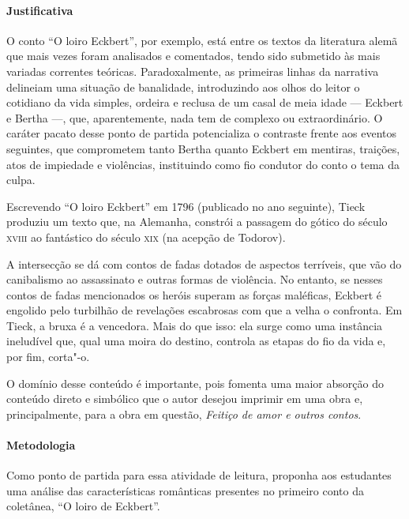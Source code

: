\documentclass[12pt]{extarticle}
\begin{document}
\paragraph{Justificativa} O conto ``O loiro Eckbert'', por exemplo, está entre os textos da
literatura alemã que mais vezes foram analisados e comentados, tendo
sido submetido às mais variadas correntes teóricas. Paradoxalmente, as
primeiras linhas da narrativa delineiam uma situação de banalidade,
introduzindo aos olhos do leitor o cotidiano da vida simples, ordeira e
reclusa de um casal de meia idade --- Eckbert e Bertha ---, que,
aparentemente, nada tem de complexo ou extraordinário. O caráter pacato
desse ponto de partida potencializa o contraste frente aos eventos
seguintes, que comprometem tanto Bertha quanto Eckbert em mentiras,
traições, atos de impiedade e violências, instituindo como fio condutor
do conto o tema da culpa.

Escrevendo ``O loiro Eckbert'' em 1796 (publicado no ano seguinte),
Tieck produziu um texto que, na Alemanha, constrói a passagem do gótico
do século \textsc{xviii} ao fantástico do século \textsc{xix} (na acepção de Todorov).

A intersecção se dá com contos de fadas dotados de aspectos terríveis,
que vão do canibalismo ao assassinato e outras formas de violência. No
entanto, se nesses contos de fadas mencionados os heróis superam as
forças maléficas, Eckbert é engolido pelo turbilhão de revelações
escabrosas com que a velha o confronta. Em Tieck, a bruxa é a vencedora.
Mais do que isso: ela surge como uma instância ineludível que, qual uma
moira do destino, controla as etapas do fio da vida e, por fim, corta"-o.

O domínio desse conteúdo é importante, pois fomenta uma maior absorção do conteúdo 
direto e simbólico que o autor desejou imprimir em uma obra e, principalmente, 
para a obra em questão, \textit{Feitiço de amor e outros contos}.

\paragraph{Metodologia}
Como ponto de partida para essa atividade de leitura, proponha aos estudantes 
uma análise das características românticas presentes no primeiro conto da 
coletânea, ``O loiro de Eckbert''.
\end{document}
